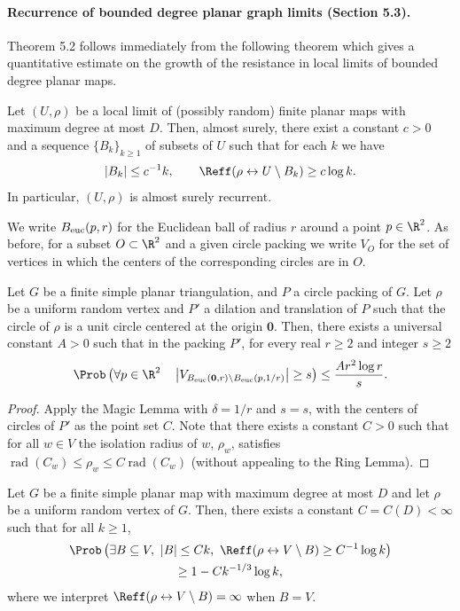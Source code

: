 \paragraph{Recurrence of bounded degree planar graph limits (Section 5.3).}
Theorem 5.2 follows immediately from the following theorem which gives a quantitative estimate on the growth of the resistance in local limits of bounded degree planar maps.
\begin{theorem}[5.8]
Let $(U,\rho)$ be a local limit of (possibly random) finite planar maps with maximum degree at most $D$. Then, almost surely, there exist a constant $c>0$ and a sequence $\{B_k\}_{k\ge1}$ of subsets of $U$ such that for each $k$ we have
\[
|B_k|\le c^{-1}k,\qquad \Reff(\rho\leftrightarrow U\setminus B_k)\ge c\log k.
\]
In particular, $(U,\rho)$ is almost surely recurrent.
\end{theorem}
We write $B_{\rm euc}(p,r)$ for the Euclidean ball of radius $r$ around a point $p\in\R^2$. As before, for a subset $O\subset\R^2$ and a given circle packing we write $V_O$ for the set of vertices in which the centers of the corresponding circles are in $O$.
\begin{corollary}[5.9]
Let $G$ be a finite simple planar triangulation, and $P$ a circle packing of $G$. Let $\rho$ be a uniform random vertex and $P'$ a dilation and translation of $P$ such that the circle of $\rho$ is a unit circle centered at the origin $\mathbf0$. Then, there exists a universal constant $A>0$ such that in the packing $P'$, for every real $r\ge2$ and integer $s\ge2$
\[
\Prob\left(\forall p\in\R^2\quad\left|V_{B_{\rm euc}(\mathbf0,r)\setminus B_{\rm euc}(p,1/r)}\right|\ge s\right)\le\frac{Ar^2\log r}{s}.
\]
\end{corollary}
\begin{proof}
Apply the Magic Lemma with $\delta=1/r$ and $s=s$, with the centers of circles of $P'$ as the point set $C$. Note that there exists a constant $C>0$ such that for all $w\in V$ the isolation radius of $w$, $\rho_w$, satisfies $\operatorname{rad}(C_w)\le\rho_w\le C\operatorname{rad}(C_w)$ (without appealing to the Ring Lemma).
\end{proof}
\begin{lemma}[5.10]
Let $G$ be a finite simple planar map with maximum degree at most $D$ and let $\rho$ be a uniform random vertex of $G$. Then, there exists a constant $C=C(D)<\infty$ such that for all $k\ge1$,
\begin{multline*}
\Prob\left(\exists B\subseteq V,\ |B|\le Ck,\ \Reff(\rho\leftrightarrow V\setminus B)\ge C^{-1}\log k\right)\\
\ge1-Ck^{-1/3}\log k,
\end{multline*}
where we interpret $\Reff(\rho\leftrightarrow V\setminus B)=\infty$ when $B=V$.
\end{lemma}

